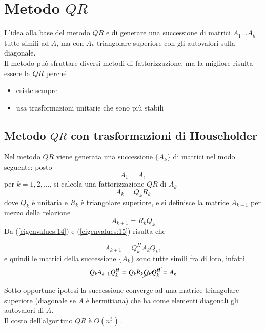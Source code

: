 \section{Metodo $QR$}
L'idea alla base del metodo $QR$ e di generare una successione di
matrici $A_1 \ldots A_k$ tutte simili ad $A$, ma con $A_k$ triangolare
superiore con gli autovalori sulla diagonale.\\
Il metodo può sfruttare diversi metodi di fattorizzazione, ma la
migliore risulta essere la $QR$ perch\'e
\begin{itemize}
\item esiste sempre
\item usa trasformazioni unitarie che sono pi\`u stabili
\end{itemize}

\subsection{Metodo $QR$ con trasformazioni di Householder}
Nel metodo $QR$ viene generata una successione $\{A_k \}$
di matrici nel modo seguente: posto
$$A_1 = A,$$
per $k = 1, 2, \ldots$, si calcola una fattorizzazione $QR$ di $A_k$
\begin{equation}
  \label{eigenvalues:14}
  A_k = Q_k R_k
\end{equation}
dove $Q_k$ \`e unitaria e $R_k$ \`e triangolare superiore, e si
definisce la matrice $A_{k+1}$ per mezzo della relazione
\begin{equation}
  \label{eigenvalues:15}
  A_{k+1}= R_k Q_k
\end{equation}
Da (\ref{eigenvalues:14}) e (\ref{eigenvalues:15})  risulta che

\begin{equation}
  \label{eigenvalues:16}
A_{k+1} = Q_k^H A_k Q_k ,
\end{equation}
e quindi le matrici della successione $\{A_k \}$ sono tutte simili
fra di loro, infatti
$$ Q_{k} A_{k+1} Q_{k}^{H} = Q_{k} R_{k} \cancel{Q_{k} Q_{k}^{H}} = A_{k}$$

Sotto opportune ipotesi la successione converge ad una matrice
triangolare superiore (diagonale se $A$ \`e hermitiana) che ha
come elementi diagonali gli autovalori di $A$.\\
Il costo dell'algoritmo $QR$ \`e   $O(n^3)$.

